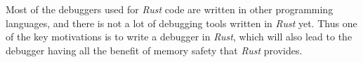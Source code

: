 Most of the debuggers used for \emph{Rust} code are written in other programming languages, and there is not a lot of debugging tools written in \emph{Rust} yet.
Thus one of the key motivations is to write a debugger in \emph{Rust}, which will also lead to the debugger having all the benefit of memory safety that \emph{Rust} provides.




